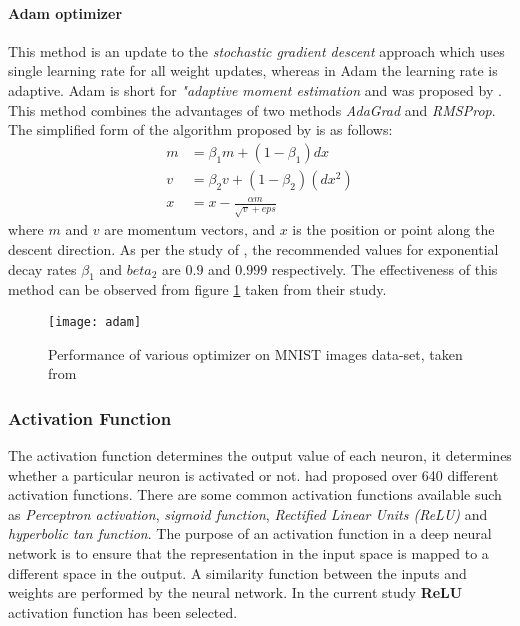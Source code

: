 \paragraph{Adam optimizer}
This method is an update to the \textit{stochastic gradient descent} approach which uses single learning rate for all weight updates, whereas in Adam the learning rate is adaptive. Adam is short for \textit{"adaptive moment estimation} and was proposed by \citet{DBLP:journals/corr/KingmaB14}. This method combines the advantages of two methods \textit{AdaGrad} and \textit{RMSProp}. The simplified form of the algorithm proposed by \citet{DBLP:journals/corr/KingmaB14} is as follows:
\begin{align}
m &= \beta_{1}m + \left(1-\beta_{1}\right)dx\\
v &= \beta_{2}v + \left(1-\beta_{2}\right)\left(dx^2\right)\\
x &= x - \frac{\alpha m}{\sqrt{v}+eps}
\end{align}
where $m$ and $v$ are momentum vectors, and $x$ is the position or point along the descent direction. As per the study of \citet{DBLP:journals/corr/KingmaB14}, the recommended values for exponential decay rates $\beta_1$ and $beta_2$ are $0.9$ and $0.999$ respectively. The effectiveness of this method can be observed from figure \ref{fig:2.13} taken from their study.
\begin{figure}[h]
\centering
\texttt{[image: adam]}
\caption{Performance of various optimizer on MNIST images data-set, taken from \citet{DBLP:journals/corr/KingmaB14}}
\label{fig:2.13}
\end{figure}
\subsubsection{Activation Function}
The activation function determines the output value of each neuron, it determines whether a particular neuron is activated or not. \citet{duch1999survey} had proposed over 640 different activation functions. There are some common activation functions available such as \textit{Perceptron activation}, \textit{sigmoid function}, \textit{Rectified Linear Units (ReLU)} and \textit{hyperbolic tan function}. The purpose of an activation function in a deep neural network is to ensure that the representation in the input space is mapped to a different space in the output. A similarity function between the inputs and weights are performed by the neural network. In the current study \textbf{ReLU} activation function has been selected. 
